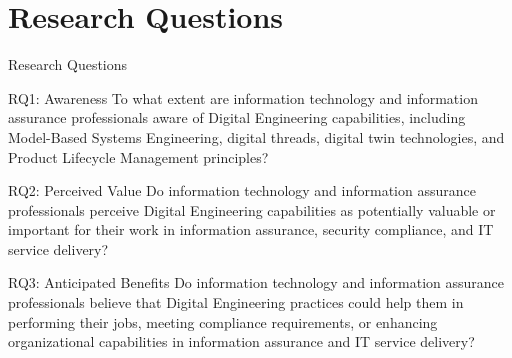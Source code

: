 \documentclass{beamer}
\begin{document}
\section{Research Questions}
\begin{frame}[allowframebreaks]{Research Questions}
  \begin{small}
    \begin{block}{RQ1: Awareness}
      To what extent are information technology and information assurance professionals aware of Digital Engineering capabilities, including Model-Based Systems Engineering, digital threads, digital twin technologies, and Product Lifecycle Management principles?
    \end{block}

    \begin{block}{RQ2: Perceived Value}
      Do information technology and information assurance professionals perceive Digital Engineering capabilities as potentially valuable or important for their work in information assurance, security compliance, and IT service delivery?
    \end{block}

    \begin{block}{RQ3: Anticipated Benefits}
      Do information technology and information assurance professionals believe that Digital Engineering practices could help them in performing their jobs, meeting compliance requirements, or enhancing organizational capabilities in information assurance and IT service delivery?
    \end{block}
  \end{small}
\end{frame}
\end{document}
